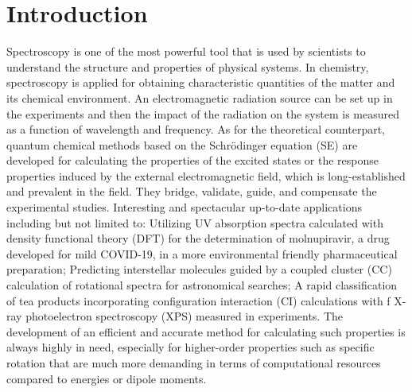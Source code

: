 \section{Introduction} \label{intro} 

Spectroscopy is one of the most powerful tool that is used by scientists to understand the structure and properties of physical systems. In chemistry, spectroscopy is applied for obtaining characteristic quantities of the matter and its chemical environment. An electromagnetic radiation source can be set up in the experiments and then the impact of the radiation on the system is measured as a function of wavelength and frequency. \cite{Svanberg2023} As for the theoretical counterpart, quantum chemical methods based on the Schr\"odinger equation (SE) are developed for calculating the properties of the excited states or the response properties induced by the external electromagnetic field, which is long-established and prevalent  in the field. They bridge, validate, guide, and compensate the experimental studies. Interesting and spectacular up-to-date applications including but not limited to: Utilizing UV absorption spectra calculated with density functional theory (DFT) for the determination of molnupiravir, a drug developed for mild COVID-19, in a more environmental friendly pharmaceutical preparation;\cite{Abdelazim2023} Predicting interstellar molecules guided by a coupled cluster (CC) calculation of rotational spectra for astronomical searches;\cite{Puzzarini2023} A rapid classification of tea products incorporating configuration interaction (CI) calculations with f X-ray photoelectron spectroscopy (XPS) measured in experiments.\cite{Jiang2022} The development of an efficient and accurate method for calculating such properties is always highly in need, especially for higher-order properties such as specific rotation that are much more demanding in terms of computational resources compared to energies or dipole moments.

